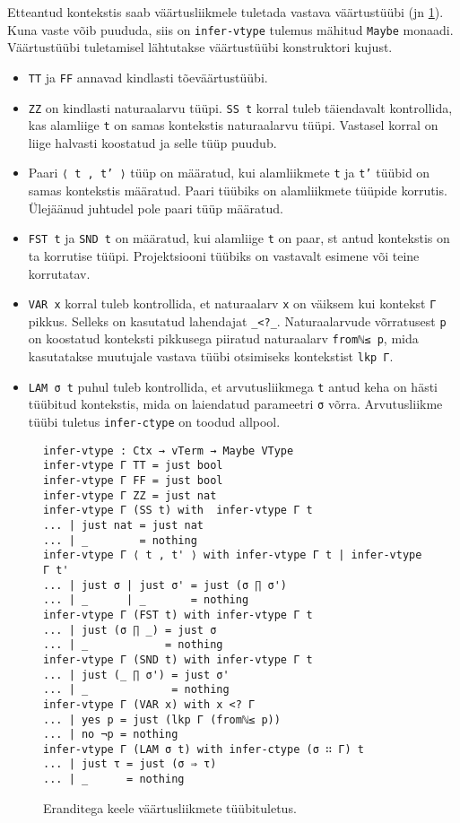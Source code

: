 \documentclass[a4paper,12pt]{article}
\begin{document}
Etteantud kontekstis saab väärtusliikmele tuletada vastava väärtustüübi (jn \ref{fig:exc.infer-vtype}).
Kuna vaste võib puududa, siis on {\tt infer-vtype} tulemus mähitud {\tt Maybe} monaadi.
Väärtustüübi tuletamisel lähtutakse väärtustüübi konstruktori kujust.
\begin{itemize}
\item {\tt TT} ja {\tt FF} annavad kindlasti tõeväärtustüübi.
\item {\tt ZZ} on kindlasti naturaalarvu tüüpi. {\tt SS t} korral tuleb täiendavalt kontrollida, kas alamliige {\tt t} on samas kontekstis naturaalarvu tüüpi. Vastasel korral on liige halvasti koostatud ja selle tüüp puudub.
\item Paari {\tt ⟨ t , t' ⟩} tüüp on määratud, kui alamliikmete {\tt t} ja {\tt t'} tüübid on samas kontekstis määratud. Paari tüübiks on alamliikmete tüüpide korrutis. Ülejäänud juhtudel pole paari tüüp määratud.
\item {\tt FST t} ja {\tt SND t} on määratud, kui alamliige {\tt t} on paar, st antud kontekstis on ta korrutise tüüpi. Projektsiooni tüübiks on vastavalt esimene või teine korrutatav.
\item {\tt VAR x} korral tuleb kontrollida, et naturaalarv {\tt x} on väiksem kui kontekst {\tt Γ} pikkus. Selleks on kasutatud lahendajat {\tt _<?_}. Naturaalarvude võrratusest {\tt p} on koostatud konteksti pikkusega piiratud naturaalarv {\tt fromℕ≤ p}, mida kasutatakse muutujale vastava tüübi otsimiseks kontekstist {\tt lkp Γ}.
\item {\tt LAM σ t} puhul tuleb kontrollida, et arvutusliikmega {\tt t} antud keha on hästi tüübitud kontekstis, mida on laiendatud parameetri {\tt σ} võrra. Arvutusliikme tüübi tuletus {\tt infer-ctype} on toodud allpool.
\end{itemize}

\begin{figure}
  \begin{BVerbatim}
infer-vtype : Ctx → vTerm → Maybe VType
infer-vtype Γ TT = just bool
infer-vtype Γ FF = just bool
infer-vtype Γ ZZ = just nat
infer-vtype Γ (SS t) with  infer-vtype Γ t
... | just nat = just nat
... | _        = nothing
infer-vtype Γ ⟨ t , t' ⟩ with infer-vtype Γ t | infer-vtype Γ t'
... | just σ | just σ' = just (σ ∏ σ')
... | _      | _       = nothing
infer-vtype Γ (FST t) with infer-vtype Γ t
... | just (σ ∏ _) = just σ
... | _            = nothing
infer-vtype Γ (SND t) with infer-vtype Γ t
... | just (_ ∏ σ') = just σ'
... | _             = nothing
infer-vtype Γ (VAR x) with x <? Γ
... | yes p = just (lkp Γ (fromℕ≤ p))
... | no ¬p = nothing
infer-vtype Γ (LAM σ t) with infer-ctype (σ ∷ Γ) t
... | just τ = just (σ ⇒ τ)
... | _      = nothing
  \end{BVerbatim}
  \caption{Eranditega keele väärtusliikmete tüübituletus.}
  \label{fig:exc.infer-vtype}
\end{figure}
\end{document}
